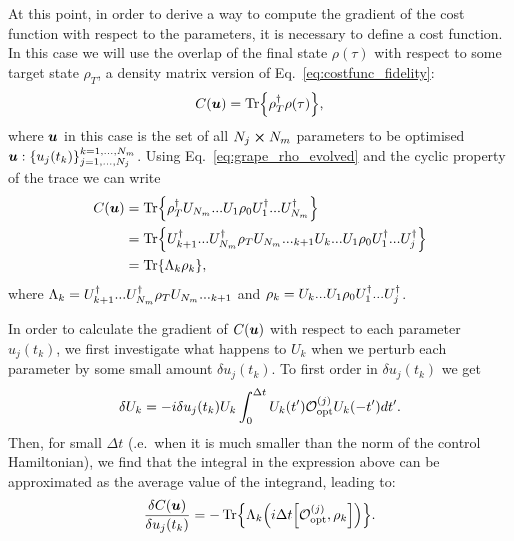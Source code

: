 At this point, in order to derive a way to compute the gradient of the cost function with respect to the parameters, it is necessary to define a cost function. In this case we will use the overlap of the final state $\rho(\tau)$ with respect to some target state $\rho_T$, a density matrix version of Eq.~\ref{eq:costfunc_fidelity}:
\begin{equation}
    C(\boldsymbol{u}) = \Tr{\rho_T^{\dagger}\rho(\tau)},
\end{equation}
where $\boldsymbol{u}$ in this case is the set of all $N_j \cross N_m$ parameters to be optimised $\boldsymbol{u}: \{ u_j(t_k)\}_{j = 1, ..., N_j}^{k = 1,...,N_m}$. Using Eq.~\ref{eq:grape_rho_evolved} and the cyclic property of the trace we can write
\begin{equation}\label{eq:grape_costfunc_rewrite}
    \begin{aligned}
        C(\boldsymbol{u} ) &= \Tr{\rho_T^{\dagger}U_{N_m} ... U_{1} \rho_0 U^{\dagger}_{1} ... U^{\dagger}_{N_m}} \\
        &=  \Tr{U^{\dagger}_{k+1} ... U^{\dagger}_{N_m} \rho_T U_{N_m} ... _{k+1} U_{k} ... U_{1} \rho_0 U^{\dagger}_{1} ... U^{\dagger}_{j}} \\
        &= \Tr{\Lambda_k \rho_k},
    \end{aligned}
\end{equation}
where $\Lambda_k = U^{\dagger}_{k+1} ... U^{\dagger}_{N_m} \rho_T U_{N_m} ... _{k+1}$ and $\rho_k = U_{k} ... U_{1} \rho_0 U^{\dagger}_{1} ... U^{\dagger}_{j}$. 

In order to calculate the gradient of $C(\boldsymbol{u})$ with respect to each parameter $u_j(t_k)$, we first investigate what happens to $U_k$ when we perturb each parameter by some small amount $\delta u_j(t_k)$. To first order in $\delta u_j(t_k)$ we get
\begin{equation}
    \delta U_k = -i \delta u_j(t_k) U_k \int_0^{\Delta t} U_k(t') \mathcal{O}_{\rm opt}^{(j)} U_k(-t') dt'.
\end{equation}
Then, for small $\Delta t$ (\@i.e.~when it is much smaller than the norm of the control Hamiltonian), we find that the integral in the expression above can be approximated as the average value of the integrand, leading to:
\begin{equation}\label{eq:grape_costfunc_gradient}
    \frac{\delta C(\ubb)}{\delta u_j(t_k)} = - \Tr{\Lambda_k \Big(i\Delta t \comm{\mathcal{O}_{\rm opt}^{(j)}}{\rho_k}\Big)}.
\end{equation}


